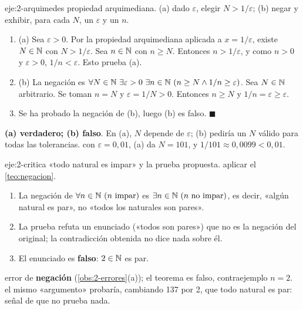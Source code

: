 \begin{solucion}{eje:2-arquimedes}
\datos propiedad arquimediana.
\planteamiento (a) dado $\varepsilon$, elegir $N>1/\varepsilon$; (b) negar y exhibir, para cada $N$, un $\varepsilon$ y un $n$.
\pasos
\begin{enumerate}[label=\arabic*.]
  \item (a) Sea $\varepsilon>0$. Por la propiedad arquimediana aplicada a $x=1/\varepsilon$, existe $N\in\mathbb{N}$ con $N>1/\varepsilon$. Sea $n\in\mathbb{N}$ con $n\ge N$. Entonces $n>1/\varepsilon$, y como $n>0$ y $\varepsilon>0$, $1/n<\varepsilon$. Esto prueba (a).
  \item (b) La negación es $\forall N\in\N\ \exists\varepsilon>0\ \exists n\in\N\ (n\ge N\wedge 1/n\ge\varepsilon)$. Sea $N\in\mathbb{N}$ arbitrario. Se toman $n=N$ y $\varepsilon=1/N>0$. Entonces $n\ge N$ y $1/n=\varepsilon\ge\varepsilon$.
  \item Se ha probado la negación de (b), luego (b) es falso. $\blacksquare$
\end{enumerate}
\resultado \textbf{(a) verdadero; (b) falso}. En (a), $N$ depende de $\varepsilon$; (b) pediría un $N$ válido para todas las tolerancias.
\comprobacion con $\varepsilon=0{,}01$, (a) da $N=101$, y $1/101\approx 0{,}0099<0{,}01$.
\end{solucion}

\begin{solucion}{eje:2-critica}
\datos «todo natural es impar» y la prueba propuesta.
\planteamiento aplicar el \cref{teo:negacion}.
\pasos
\begin{enumerate}[label=\arabic*.]
  \item La negación de $\forall n\in\N\ (n\text{ impar})$ es $\exists n\in\N\ (n\text{ no impar})$, es decir, «algún natural es par», no «todos los naturales son pares».
  \item La prueba refuta un enunciado («todos son pares») que no es la negación del original; la contradicción obtenida no dice nada sobre él.
  \item El enunciado es \textbf{falso}: $2\in\mathbb{N}$ es par.
\end{enumerate}
\resultado error de \textbf{negación} (\cref{obs:2-errores}(a)); el teorema es falso, contraejemplo $n=2$.
\comprobacion el mismo «argumento» probaría, cambiando 137 por 2, que todo natural es par: señal de que no prueba nada.
\end{solucion}

